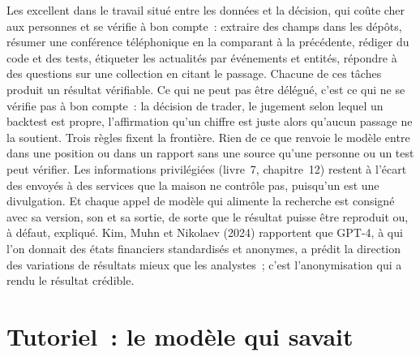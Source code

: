Les  excellent dans le travail situé entre les données et la décision, qui coûte cher aux personnes et se vérifie à bon compte~: extraire
des champs dans les dépôts, résumer une conférence téléphonique en la comparant à la précédente, rédiger du code et des tests, étiqueter les actualités par événements et
entités, répondre à des questions sur une collection en citant le passage. Chacune de ces tâches produit un résultat vérifiable. Ce qui ne peut pas
être délégué, c'est ce qui ne se vérifie pas à bon compte~: la décision de trader, le jugement selon lequel un backtest est propre, l'affirmation
qu'un chiffre est juste alors qu'aucun passage ne la soutient. Trois règles fixent la frontière. Rien de ce que renvoie le modèle entre dans une
position ou dans un rapport sans une source qu'une personne ou un test peut vérifier. Les informations privilégiées (livre~7,
chapitre~12) restent à l'écart des  envoyés à des services que la maison ne contrôle pas, puisqu'un  est une divulgation. Et chaque appel de modèle
qui alimente la recherche est consigné avec sa version, son  et sa sortie, de sorte que le résultat puisse être reproduit ou, à défaut,
expliqué. Kim, Muhn et Nikolaev (2024) rapportent que GPT-4, à qui l'on donnait des états financiers standardisés et anonymes, a prédit
la direction des variations de résultats mieux que les analystes~; c'est l'anonymisation qui a rendu le résultat crédible.

\section{Tutoriel~: le modèle qui savait}\label{tut:ml:large-language-models-in-finance:tut}

